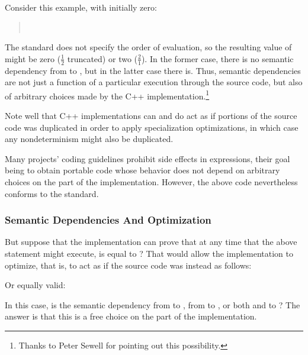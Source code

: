 \documentclass[10]{article}
\begin{document}
Consider this example, with  initially zero:

\begin{quote}
	 \\
\end{quote}

The standard does not specify the order of evaluation, so the resulting
value of  might be zero ($\frac{1}{2}$ truncated) or two
($\frac{2}{1}$).
In the former case, there is no semantic dependency from  to
, but in the latter case there is.
Thus, semantic dependencies are not just a function of a particular
execution through the source code, but also of arbitrary choices made
by the C++ implementation.\footnote{
	Thanks to Peter Sewell for pointing out this possibility.}

Note well that C++ implementations can and do act as if portions of
the source code was duplicated in order to apply specialization
optimizations, in which case any nondeterminism might also be
duplicated.

Many projects' coding guidelines prohibit side effects in expressions,
their goal being to obtain portable code whose behavior does not depend
on arbitrary choices on the part of the implementation.
However, the above code nevertheless conforms to the standard.

\subsubsection{Semantic Dependencies And Optimization}
\label{sec:Semantic Dependencies And Optimization}

But suppose that the implementation can prove that at any time that
the above statement might execute,  is equal to ?
That would allow the implementation to optimize, that is, to act as if
the source code was instead as follows:

\begin{quote}
\end{quote}

Or equally valid:

\begin{quote}
\end{quote}

In this case, is the semantic dependency from  to ,
from  to , or both  and  to ?
The answer is that this is a free choice on the part of the
implementation.
\end{document}

